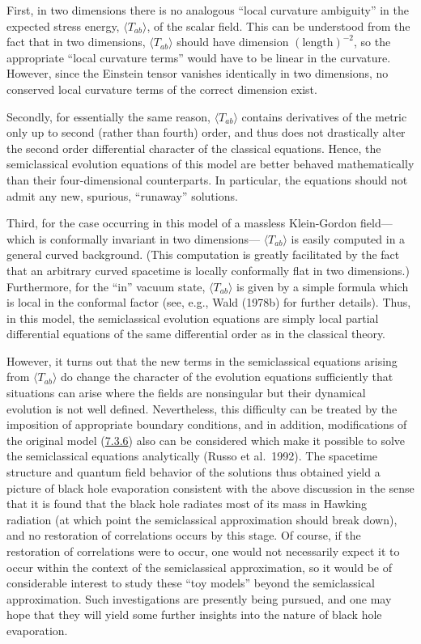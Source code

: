 \documentclass[11pt,a4paper]{article}
\begin{document}
First, in two dimensions there is no analogous ``local curvature ambiguity'' in the expected stress energy, \(\langle T_{ab}\rangle \), of the scalar field. This can be understood from the fact that in two dimensions, \(\langle T_{ab}\rangle \) should have dimension \((\text{length})^{-2}\), so the appropriate ``local curvature terms'' would have to be linear in the curvature. However, since the Einstein tensor vanishes identically in two dimensions, no conserved local curvature terms of the correct dimension exist.

\hypertarget{source-200}{}

Secondly, for essentially the same reason, \(\langle T_{ab}\rangle \) contains derivatives of the metric only up to second (rather than fourth) order, and thus does not drastically alter the second order differential character of the classical equations. Hence, the semiclassical evolution equations of this model are better behaved mathematically than their four-dimensional counterparts. In particular, the equations should not admit any new, spurious, ``runaway'' solutions.

Third, for the case occurring in this model of a massless Klein-Gordon field---which is conformally invariant in two dimensions--- \(\langle T_{ab} \rangle\) is easily computed in a general curved background. (This computation is greatly facilitated by the fact that an arbitrary curved spacetime is locally conformally flat in two dimensions.) Furthermore, for the ``in'' vacuum state, \(\langle T_{ab} \rangle\) is given by a simple formula which is local in the conformal factor (see, e.g., Wald (1978b) for further details). Thus, in this model, the semiclassical evolution equations are simply local partial differential equations of the same differential order as in the classical theory.

However, it turns out that the new terms in the semiclassical equations arising from \(\langle T_{ab}\rangle\) do change the character of the evolution equations sufficiently that situations can arise where the fields are nonsingular but their dynamical evolution is not well defined. Nevertheless, this difficulty can be treated by the imposition of appropriate boundary conditions, and in addition, modifications of the original model (\hyperref[eq:7.3.6]{7.3.6}) also can be considered which make it possible to solve the semiclassical equations analytically (Russo et al.~1992). The spacetime structure and quantum field behavior of the solutions thus obtained yield a picture of black hole evaporation consistent with the above discussion in the sense that it is found that the black hole radiates most of its mass in Hawking radiation (at which point the semiclassical approximation should break down), and no restoration of correlations occurs by this stage. Of course, if the restoration of correlations were to occur, one would not necessarily expect it to occur within the context of the semiclassical approximation, so it would be of considerable interest to study these ``toy models'' beyond the semiclassical approximation. Such investigations are presently being pursued, and one may hope that they will yield some further insights into the nature of black hole evaporation.
\end{document}
